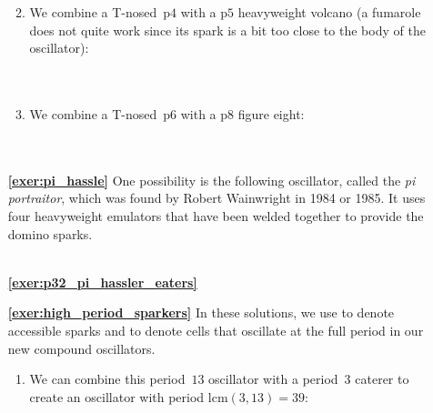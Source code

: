 \begin{multicols}{2}
\begin{itemize}[leftmargin=0em]
\begin{enumerate}[leftmargin=1.5em,label=\bf\color{ocre}(\alph*)]
		
		\item We combine a T-nosed~p$4$ with a p$5$ heavyweight volcano (a fumarole does not quite work since its spark is a bit too close to the body of the oscillator): \\[-0.6em]
		
		 \\[-0.8em]
		
		 \\
		
		\item We combine a T-nosed~p$6$ with a p$8$ figure eight: \\[-0.6em]
		
		 \\[-0.8em]
		
		 \\
	\end{enumerate}


	\item[\bf\color{ocre}\sffamily\ref{exer:pi_hassle}] One possibility is the following oscillator, called the \emph{pi portraitor}, which was found by Robert Wainwright in 1984 or 1985. It uses four heavyweight emulators that have been welded together to provide the domino sparks. \\[-0.6em]
	
	 \\
	
	
	\item[\bf\color{ocre}\sffamily\ref{exer:p32_pi_hassler_eaters}]  \\


	\item[\bf\color{ocre}\sffamily\ref{exer:high_period_sparkers}] In these solutions, we use  to denote accessible sparks and  to denote cells that oscillate at the full period in our new compound oscillators.
	\begin{enumerate}[leftmargin=1.5em,label=\bf\color{ocre}(\alph*)]
		\item We can combine this period~$13$ oscillator with a period~$3$ caterer to create an oscillator with period $\mathrm{lcm}(3,13) = 39$: \\[-0.6em]
		

\end{enumerate}
\end{itemize}
\end{multicols}
